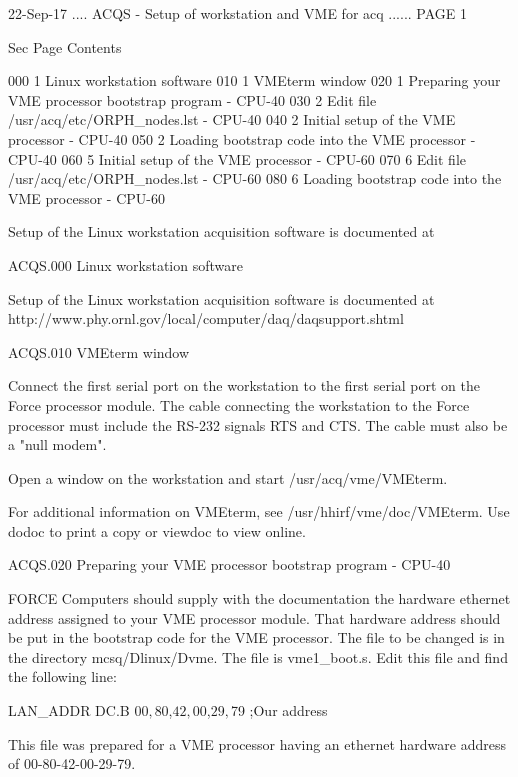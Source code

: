    22-Sep-17 .... ACQS  - Setup of workstation and VME for acq ...... PAGE   1
 
 
 
   Sec Page     Contents
 
   000   1  Linux workstation software
   010   1  VMEterm window
   020   1  Preparing your VME processor bootstrap program - CPU-40
   030   2  Edit file /usr/acq/etc/ORPH_nodes.lst - CPU-40
   040   2  Initial setup of the VME processor - CPU-40
   050   2  Loading bootstrap code into the VME processor - CPU-40
   060   5  Initial setup of the VME processor - CPU-60
   070   6  Edit file /usr/acq/etc/ORPH_nodes.lst - CPU-60
   080   6  Loading bootstrap code into the VME processor - CPU-60
 
 
   Setup of the Linux workstation acquisition software is documented at
 
   ACQS.000  Linux workstation software
 
   Setup  of  the  Linux  workstation  acquisition  software  is documented at
   http://www.phy.ornl.gov/local/computer/daq/daqsupport.shtml
 
 
   ACQS.010  VMEterm window
 
   Connect the first serial port on the workstation to the first  serial  port
   on  the Force processor module. The cable connecting the workstation to the
   Force processor must include the RS-232 signals RTS  and  CTS.   The  cable
   must also be a "null modem".
 
   Open a window on the workstation and start /usr/acq/vme/VMEterm.
 
   For  additional  information  on  VMEterm,  see /usr/hhirf/vme/doc/VMEterm.
   Use dodoc to print a copy or viewdoc to view online.
 
 
   ACQS.020  Preparing your VME processor bootstrap program - CPU-40
 
   FORCE Computers should supply with the documentation the hardware  ethernet
   address  assigned  to  your  VME  processor  module.  That hardware address
   should be put in the bootstrap code for the VME processor.  The file  to be
   changed  is  in  the  directory mcsq/Dlinux/Dvme.  The file is vme1_boot.s.
   Edit this file and find the following line:
 
   LAN_ADDR        DC.B    $00,$80,$42,$00,$29,$79         ;Our address
 
   This file was prepared for a VME  processor  having  an  ethernet  hardware
   address of  00-80-42-00-29-79.
 
